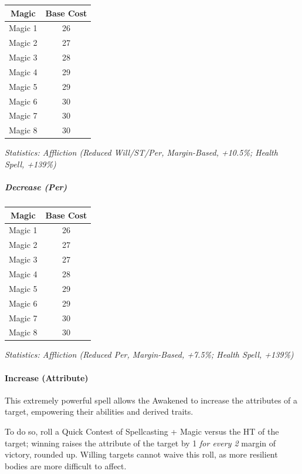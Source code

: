 \begin{multicols*}{3}
		\begin{center}
		\begin{tabular}{|c|c|}
			\hline
			Magic & Base Cost \\
			\hline
			\hline
			Magic 1 & 26 \\
			Magic 2 & 27 \\
			Magic 3 & 28 \\
			Magic 4 & 29 \\
			Magic 5 & 29 \\
			Magic 6 & 30 \\
			Magic 7 & 30 \\
			Magic 8 & 30 \\
			\hline
		\end{tabular}
	\end{center}	
	
	\textcolor{OliveGreen}{\textit{Statistics: Affliction (Reduced Will/ST/Per, Margin-Based, +10.5\%; Health Spell, +139\%) }}
	
	
	\subparagraph{Decrease (Per)}
	
	\begin{center}
		\begin{tabular}{|c|c|}
			\hline
			Magic & Base Cost \\
			\hline
			\hline
			Magic 1 & 26 \\
			Magic 2 & 27 \\
			Magic 3 & 27 \\
			Magic 4 & 28 \\
			Magic 5 & 29 \\
			Magic 6 & 29 \\
			Magic 7 & 30 \\
			Magic 8 & 30 \\
			\hline
		\end{tabular}
	\end{center}	
	
	\textcolor{OliveGreen}{\textit{Statistics: Affliction (Reduced Per, Margin-Based, +7.5\%; Health Spell, +139\%) }}
		
	\paragraph{Increase (Attribute)}
	
	This extremely powerful spell allows the Awakened to increase the attributes of a target, empowering their abilities and derived traits.
	
	To do so, roll a Quick Contest of Spellcasting + Magic versus the HT of the target; winning raises the attribute of the target by 1 \textit{for every 2} margin of victory, rounded up. Willing targets cannot waive this roll, as more resilient bodies are more difficult to affect.
	

\end{multicols*}
